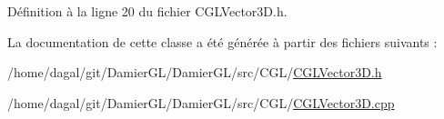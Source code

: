 Définition à la ligne 20 du fichier C\-G\-L\-Vector3\-D.\-h.



La documentation de cette classe a été générée à partir des fichiers suivants \-:\begin{DoxyCompactItemize}
\item 
/home/dagal/git/\-Damier\-G\-L/\-Damier\-G\-L/src/\-C\-G\-L/\hyperlink{_c_g_l_vector3_d_8h}{C\-G\-L\-Vector3\-D.\-h}\item 
/home/dagal/git/\-Damier\-G\-L/\-Damier\-G\-L/src/\-C\-G\-L/\hyperlink{_c_g_l_vector3_d_8cpp}{C\-G\-L\-Vector3\-D.\-cpp}\end{DoxyCompactItemize}
